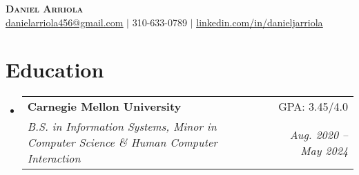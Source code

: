 \documentclass[letterpaper,11pt]{article}
\makeatletter
\newcommand{\resumeSubheading}[4]{
  \vspace{-2pt}\item
    \begin{tabular*}{0.97\textwidth}[t]{l@{\extracolsep{\fill}}r}
      \textbf{#1} & #2 \\
      \textit{\small#3} & \textit{\small #4} \\
    \end{tabular*}\vspace{-7pt}
}
\newcommand{\resumeSubHeadingListStart}{\begin{itemize}[leftmargin=0.15in, label={}]}
\newcommand{\resumeSubHeadingListEnd}{\end{itemize}}
\makeatother
\begin{document}

\begin{center}
    \textbf{\Huge \scshape Daniel Arriola} \\ \vspace{1pt}
    \href{mailto:danielarriola456@gmail.com}{\underline{danielarriola456@gmail.com}} $|$ 
    \small 310-633-0789 $|$
    \href{https://www.linkedin.com/in/danieljarriola}{\underline{linkedin.com/in/danieljarriola}}
\end{center}


\section{Education}
    \resumeSubHeadingListStart
        \resumeSubheading
        {Carnegie Mellon University}{GPA: 3.45/4.0}
        {B.S. in Information Systems, Minor in Computer Science \& Human Computer Interaction}{Aug. 2020 -- May 2024}
    \resumeSubHeadingListEnd


\end{document}
